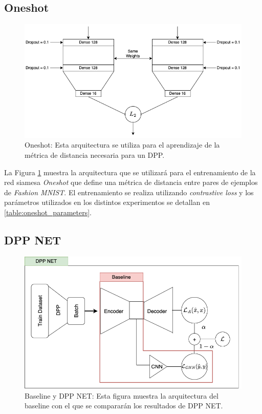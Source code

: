 \subsection{Oneshot}

\begin{figure}[ht]
    \centering
    \includegraphics[width=14cm]{img/tesis/oneshot_arquitectura.png}
    \caption{Oneshot: Esta arquitectura se utiliza para el aprendizaje de la métrica de distancia necesaria para un DPP.}
    \label{fig:oneshot_arquitectura}
\end{figure}


La Figura \ref{fig:oneshot_arquitectura} muestra la arquitectura que se utilizará para el entrenamiento de la red siamesa \textit{Oneshot} que define una métrica de distancia entre pares de ejemplos de \textit{Fashion MNIST}. El entrenamiento se realiza utilizando \textit{contrastive loss} y los parámetros utilizados en los distintos experimentos se detallan en \ref{table:oneshot_parameters}.

\subsection{DPP NET}

\begin{figure}[ht]
    \centering
    \includegraphics[width=12cm]{img/tesis/baseline_dppnet.png}
    \caption{Baseline y DPP NET: Esta figura muestra la arquitectura del baseline con el que se compararán los resultados de DPP NET.}
    \label{fig:baseline_dpp_net}
\end{figure}

